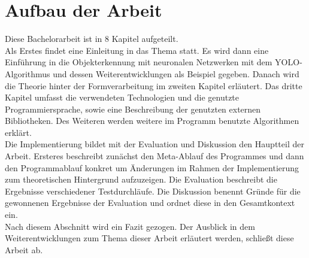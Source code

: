 \section{Aufbau der Arbeit}  \label{sec:Aufbau_Arbeit} 
{Diese Bachelorarbeit ist in 8 Kapitel aufgeteilt. \\ 
Als Erstes findet eine Einleitung in das Thema statt. Es wird dann eine Einführung in die Objekterkennung mit neuronalen Netzwerken mit dem YOLO-Algorithmus und dessen Weiterentwicklungen als Beispiel gegeben. Danach wird die Theorie hinter der Formverarbeitung im zweiten Kapitel erläutert. Das dritte Kapitel umfasst die verwendeten Technologien und die genutzte Programmiersprache, sowie eine Beschreibung der genutzten externen Bibliotheken. Des Weiteren werden weitere im Programm benutzte Algorithmen erklärt. \\
Die Implementierung bildet mit der Evaluation und Diskussion den Hauptteil der Arbeit. Ersteres beschreibt zunächst den Meta-Ablauf des Programmes und dann den Programmablauf konkret um Änderungen im Rahmen der Implementierung zum theoretischen Hintergrund aufzuzeigen. Die Evaluation beschreibt die Ergebnisse verschiedener Testdurchläufe. Die Diskussion benennt Gründe für die gewonnenen Ergebnisse der Evaluation und ordnet diese in den Gesamtkontext ein. \\
Nach diesem Abschnitt wird ein Fazit gezogen. Der Ausblick in dem Weiterentwicklungen zum Thema dieser Arbeit erläutert werden, schließt diese Arbeit ab.

}




